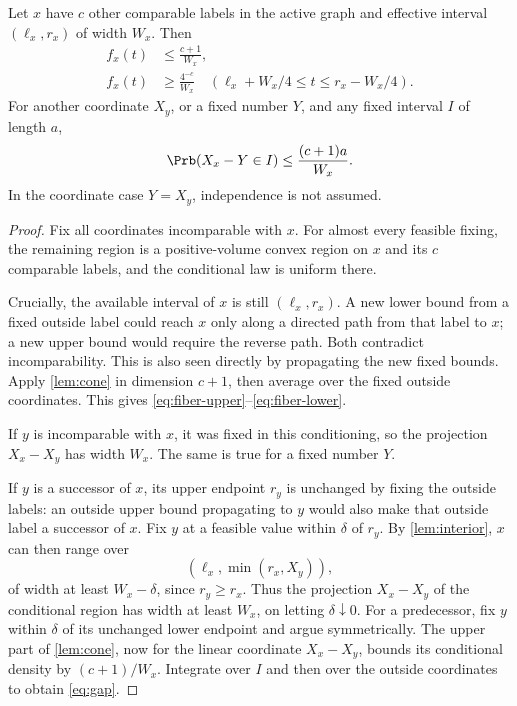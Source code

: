 \begin{lemma}\label{lem:fiber}
Let $x$ have $c$ other comparable labels in the active graph and effective interval $(\ell_x,r_x)$ of width $W_x$. Then
\begin{align}
f_x(t)&\le\frac{c+1}{W_x},\label{eq:fiber-upper}\\
f_x(t)&\ge\frac{4^{-c}}{W_x}
\quad(\ell_x+W_x/4\le t\le r_x-W_x/4).\label{eq:fiber-lower}
\end{align}
For another coordinate $X_y$, or a fixed number $Y$, and any fixed interval $I$ of length $a$,
\begin{equation}\label{eq:gap}
\Prb(X_x-Y\in I)\le\frac{(c+1)a}{W_x}.
\end{equation}
In the coordinate case $Y=X_y$, independence is not assumed.
\end{lemma}
\begin{proof}
Fix all coordinates incomparable with $x$. For almost every feasible fixing, the remaining region is a positive-volume convex region on $x$ and its $c$ comparable labels, and the conditional law is uniform there.

Crucially, the available interval of $x$ is still $(\ell_x,r_x)$. A new lower bound from a fixed outside label could reach $x$ only along a directed path from that label to $x$; a new upper bound would require the reverse path. Both contradict incomparability. This is also seen directly by propagating the new fixed bounds. Apply \cref{lem:cone} in dimension $c+1$, then average over the fixed outside coordinates. This gives \eqref{eq:fiber-upper}--\eqref{eq:fiber-lower}.

If $y$ is incomparable with $x$, it was fixed in this conditioning, so the projection $X_x-X_y$ has width $W_x$. The same is true for a fixed number $Y$.

If $y$ is a successor of $x$, its upper endpoint $r_y$ is unchanged by fixing the outside labels: an outside upper bound propagating to $y$ would also make that outside label a successor of $x$. Fix $y$ at a feasible value within $\delta$ of $r_y$. By \cref{lem:interior}, $x$ can then range over
\[
(\ell_x,\min(r_x,X_y)),
\]
of width at least $W_x-\delta$, since $r_y\ge r_x$. Thus the projection $X_x-X_y$ of the conditional region has width at least $W_x$, on letting $\delta\downarrow0$. For a predecessor, fix $y$ within $\delta$ of its unchanged lower endpoint and argue symmetrically. The upper part of \cref{lem:cone}, now for the linear coordinate $X_x-X_y$, bounds its conditional density by $(c+1)/W_x$. Integrate over $I$ and then over the outside coordinates to obtain \eqref{eq:gap}.
\end{proof}

